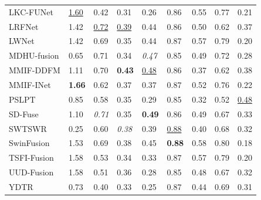 {\begin{longtable}{lllllllll}
LKC-FUNet & \underline{1.60} & 0.42 & 0.31 & 0.26 & 0.86 & 0.55 & 0.77 & 0.21 \\
LRFNet & 1.42 & \underline{0.72} & \underline{0.39} & 0.44 & 0.86 & 0.50 & 0.62 & 0.37 \\
LWNet & 1.42 & 0.69 & 0.35 & 0.44 & 0.87 & 0.57 & 0.79 & 0.20 \\
MDHU-fusion & 0.65 & 0.71 & 0.34 & \textit{0.47} & 0.85 & 0.49 & 0.72 & 0.28 \\
MMIF-DDFM & 1.11 & 0.70 & \textbf{0.43} & \underline{0.48} & 0.86 & 0.37 & 0.62 & 0.38 \\
MMIF-INet & \textbf{1.66} & 0.62 & 0.37 & 0.37 & 0.87 & 0.52 & 0.76 & 0.22 \\
PSLPT & 0.85 & 0.58 & 0.35 & 0.29 & 0.85 & 0.32 & 0.52 & \underline{0.48} \\
SD-Fuse & 1.10 & \textit{0.71} & 0.35 & \textbf{0.49} & 0.86 & 0.49 & 0.67 & 0.33 \\
SWTSWR & 0.25 & 0.60 & \textit{0.38} & 0.39 & \underline{0.88} & 0.40 & 0.68 & 0.32 \\
SwinFusion & 1.53 & 0.69 & 0.38 & 0.45 & \textbf{0.88} & 0.58 & 0.80 & 0.18 \\
TSFI-Fusion & 1.58 & 0.53 & 0.34 & 0.33 & 0.87 & 0.57 & 0.79 & 0.20 \\
UUD-Fusion & 1.58 & 0.51 & 0.36 & 0.28 & 0.85 & 0.48 & 0.67 & 0.32 \\
YDTR & 0.73 & 0.40 & 0.33 & 0.25 & 0.87 & 0.44 & 0.69 & 0.31 \\
\end{longtable}
}

